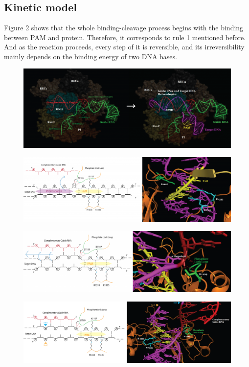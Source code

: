 \documentclass[a4paper,10pt]{article}
\begin{document}
	\subsection{Kinetic model}
	Figure 2 shows that the whole binding-cleavage process begins with the binding between PAM and protein. Therefore, it corresponds to rule 1 mentioned before. And as the reaction proceeds, every step of it is reversible, and its irreversibility mainly depends on the binding energy of two DNA bases.
	\begin{figure}
		\centering
		\includegraphics[width=0.7\linewidth]{2}
		\caption{}
		\label{fig:2}
	\end{figure}
	\begin{figure}
		\centering
		\includegraphics[width=0.7\linewidth]{3}
		\caption{}
		\label{fig:3}
	\end{figure}
	\begin{figure}
		\centering
		\includegraphics[width=0.7\linewidth]{4}
		\caption{}
		\label{fig:4}
	\end{figure}
	\begin{figure}
		\centering
		\includegraphics[width=0.7\linewidth]{5}
		\caption{}
		\label{fig:5}
	\end{figure}
	
\end{document}
